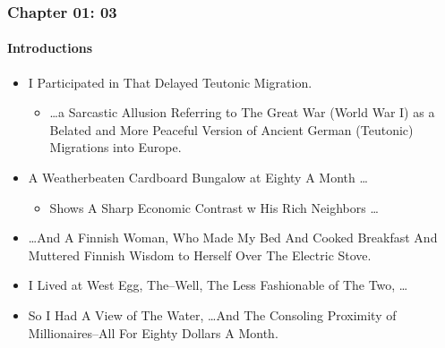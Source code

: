 \begin{frame}
\frametitle{Chapter 01: 03}
\framesubtitle{Introductions}
\label{slide:chapter-01-03}
\begin{itemize}
\item I Participated in That \alert{Delayed Teutonic Migration}.
\begin{itemize}
\pause
\item
\dots a Sarcastic Allusion Referring to The \alert{Great War (World War I)} as a Belated and More Peaceful Version of Ancient German (Teutonic) Migrations into Europe.
\end{itemize}
\pause
\item A \alert{Weatherbeaten Cardboard Bungalow} at Eighty A Month \dots
\begin{itemize}
\pause \item Shows A Sharp Economic Contrast w His Rich Neighbors \dots
\end{itemize}
\item \dots And A Finnish Woman, Who Made My Bed And Cooked Breakfast And \alert{Muttered Finnish Wisdom} to Herself Over The Electric Stove.
\pause \item I Lived at \alert{West Egg}, The--Well, The Less Fashionable of The Two, \dots
\pause \item So I Had A View of The Water, \dots And \alert{The Consoling Proximity of Millionaires}--All For Eighty Dollars A Month.
\end{itemize}
\end{frame}
